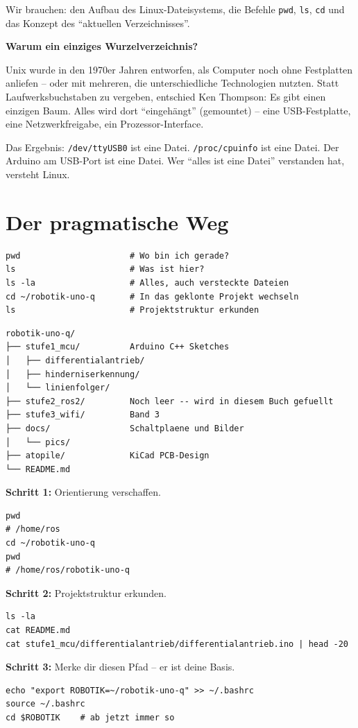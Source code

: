 \begin{wissenBox}
Wir brauchen: den Aufbau des Linux-Dateisystems, die Befehle
\texttt{pwd}, \texttt{ls}, \texttt{cd} und das Konzept des
\enquote{aktuellen Verzeichnisses}.
\end{wissenBox}

\begin{haubeBox}
\textbf{Warum ein einziges Wurzelverzeichnis?}

Unix wurde in den 1970er Jahren entworfen, als Computer
noch ohne Festplatten anliefen -- oder mit mehreren, die
unterschiedliche Technologien nutzten. Statt Laufwerksbuchstaben
zu vergeben, entschied Ken Thompson: Es gibt einen einzigen
Baum. Alles wird dort \enquote{eingehängt} (gemountet) --
eine USB-Festplatte, eine Netzwerkfreigabe, ein Prozessor-Interface.

Das Ergebnis: \texttt{/dev/ttyUSB0} ist eine Datei.
\texttt{/proc/cpuinfo} ist eine Datei. Der Arduino am USB-Port
ist eine Datei. Wer \enquote{alles ist eine Datei} verstanden hat,
versteht Linux.
\end{haubeBox}

\section{Der pragmatische Weg}

\begin{lstlisting}[style=bash]
pwd                      # Wo bin ich gerade?
ls                       # Was ist hier?
ls -la                   # Alles, auch versteckte Dateien
cd ~/robotik-uno-q       # In das geklonte Projekt wechseln
ls                       # Projektstruktur erkunden
\end{lstlisting}

\begin{lstlisting}[style=text]
robotik-uno-q/
├── stufe1_mcu/          Arduino C++ Sketches
│   ├── differentialantrieb/
│   ├── hinderniserkennung/
│   └── linienfolger/
├── stufe2_ros2/         Noch leer -- wird in diesem Buch gefuellt
├── stufe3_wifi/         Band 3
├── docs/                Schaltplaene und Bilder
│   └── pics/
├── atopile/             KiCad PCB-Design
└── README.md
\end{lstlisting}

\begin{loesungBox}
\textbf{Schritt 1:} Orientierung verschaffen.
\begin{lstlisting}[style=bash]
pwd
# /home/ros
cd ~/robotik-uno-q
pwd
# /home/ros/robotik-uno-q
\end{lstlisting}
\textbf{Schritt 2:} Projektstruktur erkunden.
\begin{lstlisting}[style=bash]
ls -la
cat README.md
cat stufe1_mcu/differentialantrieb/differentialantrieb.ino | head -20
\end{lstlisting}
\textbf{Schritt 3:} Merke dir diesen Pfad -- er ist deine Basis.
\begin{lstlisting}[style=bash]
echo "export ROBOTIK=~/robotik-uno-q" >> ~/.bashrc
source ~/.bashrc
cd $ROBOTIK    # ab jetzt immer so
\end{lstlisting}
\end{loesungBox}

